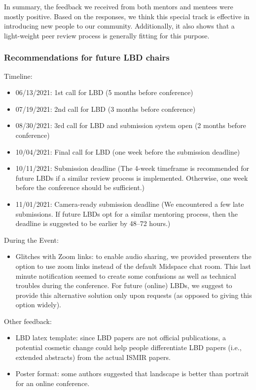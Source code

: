 \documentclass[%
10pt,								%
titlepage,						%
]
{scrartcl}
\begin{document}
            In summary, the feedback we received from both mentors and mentees were mostly positive. Based on the responses, we think this special track is effective in introducing new people to our community. Additionally, it also shows that a light-weight peer review process is generally fitting for this purpose. 
        
        \subsubsection{Recommendations for future LBD chairs}
            Timeline:
            \begin{itemize}
                \item   06/13/2021: 1st call for LBD (5 months before conference)
                \item   07/19/2021: 2nd call for LBD (3 months before conference)
                \item   08/30/2021: 3rd call for LBD and submission system open (2 months before conference)
                \item   10/04/2021: Final call for LBD (one week before the submission deadline)
                \item   10/11/2021: Submission deadline (The 4-week timeframe is recommended for future LBDs if a similar review process is implemented. Otherwise, one week before the conference should be sufficient.)
                \item   11/01/2021: Camera-ready submission deadline (We encountered a few late submissions. If future LBDs opt for a similar mentoring process, then the deadline is suggested to be earlier by 48--72 hours.)
            \end{itemize}
            
            During the Event:
            \begin{itemize}
                \item Glitches with Zoom links: to enable audio sharing, we provided presenters the option to use zoom links instead of the default Midspace chat room. This last minute notification seemed to create some confusions as well as technical troubles during the conference. For future (online) LBDs, we suggest to provide this alternative solution only upon requests (as opposed to giving this option widely). 
            \end{itemize}
            
            Other feedback:
            \begin{itemize}
                \item   LBD latex template: since LBD papers are not official publications, a potential cosmetic change could help people differentiate LBD papers (i.e., extended abstracts) from the actual ISMIR papers. 
                \item   Poster format: some authors suggested that landscape is better than portrait for an online conference.
            \end{itemize}
    
\end{document}
